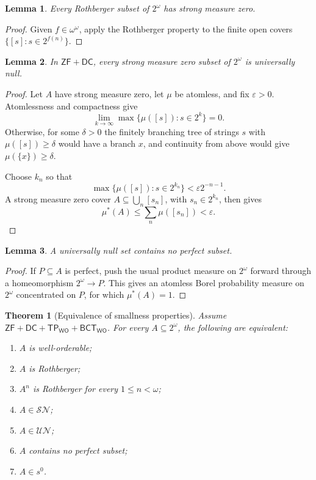 \documentclass[11pt,reqno]{amsart}
\newcommand{\WO}{\mathsf{WO}}
\newcommand{\SN}{\mathcal{SN}}
\newcommand{\UN}{\mathcal{UN}}
\newcommand{\Mar}{s^0}
\newcommand{\BCTWO}{\mathsf{BCT}_{\WO}}
\newcommand{\TP}{\mathsf{TP}_{\WO}}
\theoremstyle{plain}
\newtheorem{theorem}{Theorem}[section]
\newtheorem{lemma}[lemma]{Lemma}
\theoremstyle{definition}
\theoremstyle{remark}
\begin{document}
\begin{lemma}\label{lem:roth-sn}
Every Rothberger subset of $2^\omega$ has strong measure zero.
\end{lemma}

\begin{proof}
Given $f\in\omega^\omega$, apply the Rothberger property to the finite open
covers $\{[s]:s\in2^{f(n)}\}$.
\end{proof}

\begin{lemma}\label{lem:sn-un}
In $\mathsf{ZF}+\mathsf{DC}$, every strong measure zero subset of $2^\omega$
is universally null.
\end{lemma}

\begin{proof}
Let $A$ have strong measure zero, let $\mu$ be atomless, and fix
$\varepsilon>0$.  Atomlessness and compactness give
\[
 \lim_{k\to\infty}\max\{\mu([s]):s\in2^k\}=0.
\]
Otherwise, for some $\delta>0$ the finitely branching tree of strings $s$
with $\mu([s])\geq\delta$ would have a branch $x$, and continuity from above
would give $\mu(\{x\})\geq\delta$.

Choose $k_n$ so that
\[
 \max\{\mu([s]):s\in2^{k_n}\}<\varepsilon2^{-n-1}.
\]
A strong measure zero cover $A\subseteq\bigcup_n[s_n]$, with
$s_n\in2^{k_n}$, then gives
\[
 \mu^*(A)\leq\sum_n\mu([s_n])<\varepsilon.
\]
\end{proof}

\begin{lemma}\label{lem:un-perfect}
A universally null set contains no perfect subset.
\end{lemma}

\begin{proof}
If $P\subseteq A$ is perfect, push the usual product measure on $2^\omega$
forward through a homeomorphism $2^\omega\to P$.  This gives an atomless
Borel probability measure on $2^\omega$ concentrated on $P$, for which
$\mu^*(A)=1$.
\end{proof}

\begin{theorem}[Equivalence of smallness properties]\label{thm:smallness}
Assume $\mathsf{ZF}+\mathsf{DC}+\TP+\BCTWO$.  For every
$A\subseteq2^\omega$, the following are equivalent:
\begin{enumerate}
\item $A$ is well-orderable;
\item $A$ is Rothberger;
\item $A^n$ is Rothberger for every $1\leq n<\omega$;
\item $A\in\SN$;
\item $A\in\UN$;
\item $A$ contains no perfect subset;
\item $A\in\Mar$.
\end{enumerate}
\end{theorem}
\end{document}
